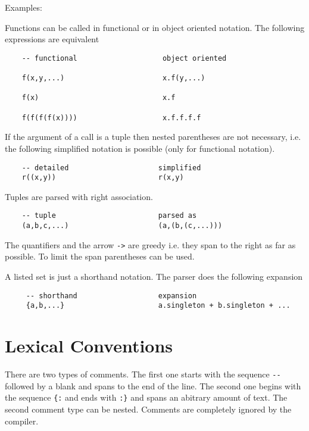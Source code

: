 \noindent Examples:

Functions can be called in functional or in object oriented notation. The
following expressions are equivalent

\begin{lstlisting}
    -- functional                    object oriented

    f(x,y,...)                       x.f(y,...)

    f(x)                             x.f

    f(f(f(f(x))))                    x.f.f.f.f
\end{lstlisting}

If the argument of a call is a tuple then nested parentheses are not
necessary, i.e. the following simplified notation is possible (only for
functional notation).

\begin{lstlisting}
    -- detailed                     simplified
    r((x,y))                        r(x,y)
\end{lstlisting}

Tuples are parsed with right association.
\begin{lstlisting}
    -- tuple                        parsed as
    (a,b,c,...)                     (a,(b,(c,...)))
\end{lstlisting}

The quantifiers and the arrow \lstinline!->! are greedy i.e. they span to the
right as far as possible. To limit the span parentheses can be used.

A listed set is just a shorthand notation. The parser does the following
expansion

\begin{lstlisting}
     -- shorthand                   expansion
     {a,b,...}                      a.singleton + b.singleton + ...
\end{lstlisting}


\section{Lexical Conventions} \label{lexconv}


There are two types of comments. The first one starts with the sequence
\lstinline!--! followed by a blank and spans to the end of the line. The
second one begins with the sequence \lstinline!{:! and ends with
  \lstinline!:}! and spans an abitrary amount of text. The second comment type
can be nested. Comments are completely ignored by the compiler.

